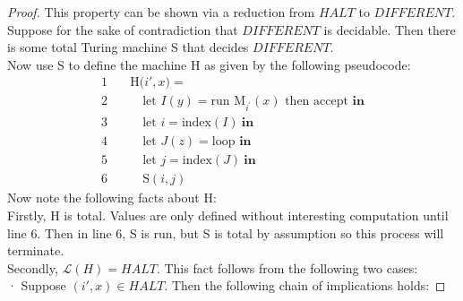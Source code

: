 \documentclass[10pt]{article}
\begin{document}
\begin{enumerate}[label={}]
            \begin{proof}
                  This property can be shown via a reduction from $HALT$ to $DIFFERENT$.\\
                  Suppose for the sake of contradiction that $DIFFERENT$ is decidable.
                  Then there is some total Turing machine S that decides $DIFFERENT$.\\
                  Now use S to define the machine H as given by the following pseudocode:
                  $$\begin{aligned}
                              1 \quad & \text{H(}i', x\text{)} =                                                                       \\
                              2 \quad & \quad \text{let } I(y) = \text{run } \text{M}_{i^{\prime}}(x) \text{ then accept } \textbf{in} \\
                              3 \quad & \quad \text{let } i = \text{index}(I) \ \textbf{in}                                            \\
                              4 \quad & \quad \text{let } J(z) = \text{loop } \textbf{in}                                              \\
                              5 \quad & \quad \text{let } j = \text{index}(J) \ \textbf{in}                                            \\
                              6 \quad & \quad \text{S}(i, j)
                        \end{aligned}$$
                  Now note the following facts about H:\\
                  Firstly, H is total. Values are only defined without interesting computation
                  until line 6. Then in line 6, S is run, but S is total by assumption so this process
                  will terminate.\\
                  Secondly, $\mathcal{L}(H)=H A L T$. This fact follows from the following two cases:\\
                  · Suppose $(i', x) \in H A L T$. Then the following chain of implications holds:


\end{proof}
\end{enumerate}
\end{document}
